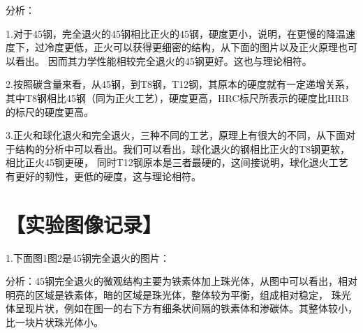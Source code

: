 \documentclass[a4paper,utf8]{article}
\begin{document}
分析：

1.对于45钢，完全退火的45钢相比正火的45钢，硬度更小，说明，在更慢的降温速度下，过冷度更低，正火可以获得更细密的结构，从下面的图片以及正火原理也可以看出。
因而其力学性能相较完全退火的45钢更好。这也与理论相符。

2.按照碳含量来看，从45钢，到T8钢，T12钢，其原本的硬度就有一定递增关系，其中T8钢相比45钢（同为正火工艺），硬度更高，HRC标尺所表示的硬度比HRB的标尺的硬度更高。

3.正火和球化退火和完全退火，三种不同的工艺，原理上有很大的不同，从下面对于结构的分析中可以看出。我们可以看出，球化退火的钢相比正火的T8钢更软，相比正火45钢更硬，
同时T12钢原本是三者最硬的，这间接说明，球化退火工艺有更好的韧性，更低的硬度，这与理论相符。

\section*{【实验图像记录】}
1.下面图1图2是45钢完全退火的图片：

\begin{figure}[!ht]
    \begin{floatrow}
    \end{floatrow}

\end{figure}

分析：45钢完全退火的微观结构主要为铁素体加上珠光体，从图中可以看出，相对明亮的区域是铁素体，暗的区域是珠光体，整体较为平衡，组成相对稳定，
珠光体呈现片状，例如在图一的右下方有细条状间隔的铁素体和渗碳体。其整体较小，比一块片状珠光体小。
\end{document}
